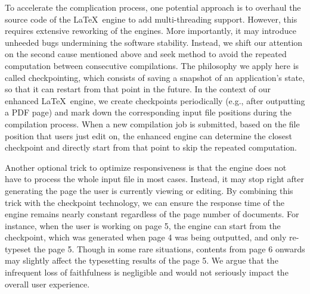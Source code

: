 \documentclass[]{sigchi}
\begin{document}
To accelerate the complication process, one potential approach is to overhaul the source code of the \LaTeX\ engine to add multi-threading support. However, this requires extensive  reworking of the engines. More importantly, it may introduce unheeded bugs undermining the software stability.
Instead, we shift our attention on the second cause mentioned above and seek method to avoid the repeated computation between consecutive compilations.
The philosophy we apply here is called checkpointing, which consists of saving a snapshot of an application's state, so that it can restart from that point in the future. In the context of our enhanced \LaTeX\ engine, we create checkpoints periodically (e.g., after outputting a PDF page) and mark down the corresponding input file positions during the compilation process. When a new compilation job is submitted, based on the file position that users just edit on, the enhanced engine can determine the closest checkpoint and directly start from that point to skip the repeated computation.

Another optional trick to optimize responsiveness is that the engine does not have to process the whole input file in most cases. Instead, it may stop right after generating the page the user is currently viewing or editing. By combining this trick with the checkpoint technology, we can ensure the response time of the engine remains nearly constant regardless of the page number of documents. For instance, when the user is working on page 5, the engine can start from the checkpoint, which was generated when page 4 was being outputted, and only re-typeset the page 5. Though in some rare situations, contents from page 6 onwards may slightly affect the typesetting results of the page 5. We argue that the infrequent loss of faithfulness is negligible and would not seriously impact the overall user experience.

\end{document}
